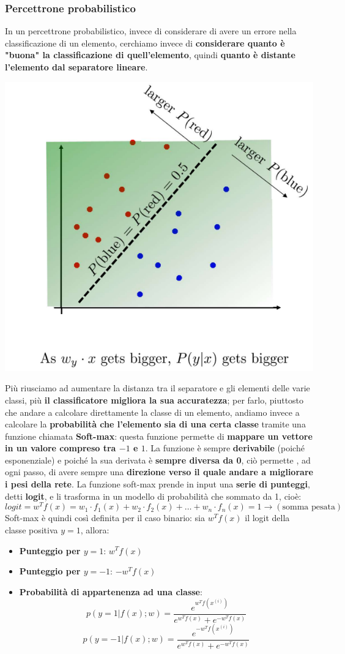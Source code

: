 \documentclass[12pt]{article}
\begin{document}
\subsubsection{Percettrone probabilistico}
In un percettrone probabilistico, invece di considerare di avere un errore nella classificazione di un elemento, cerchiamo invece di \textbf{considerare quanto è "buona" la classificazione di quell'elemento}, quindi \textbf{quanto è distante l'elemento dal separatore lineare}.
\begin{center}
    \includegraphics[width =0.50\linewidth]{Images/112.PNG}
\end{center}
Più riusciamo ad aumentare la distanza tra il separatore e gli elementi delle varie classi, più \textbf{il classificatore migliora la sua accuratezza};
per farlo, piuttosto che andare a calcolare direttamente la classe di un elemento, andiamo invece a calcolare la \textbf{probabilità che l'elemento sia di una certa classe} tramite una
funzione chiamata \textbf{Soft-max}: questa funzione permette di \textbf{mappare un vettore in un valore compreso tra $-1$ e $1$}. La funzione è sempre \textbf{derivabile} (poiché esponenziale) e poiché la sua derivata è \textbf{sempre diversa da 0}, ciò permette , ad ogni passo,
di avere sempre una \textbf{direzione verso il quale andare a migliorare i pesi della rete}. La funzione soft-max prende in input una \textbf{serie di punteggi}, detti \textbf{logit}, e li trasforma in un modello di probabilità che sommato da 1, cioè:
$$logit = w^T f(x) = w_1 \cdot f_1(x) + w_2 \cdot f_2(x) + \dots + w_n \cdot f_n(x) = 1 \rightarrow (\textrm{somma pesata})$$ 
Soft-max è quindi così definita per il caso binario: sia $w^T f(x)$ il logit della classe positiva $y = 1$, allora:
\begin{itemize}
    \item \textbf{Punteggio per $y = 1$}: $w^T f(x)$
    \item \textbf{Punteggio per $y = -1$}: $-w^T f(x)$
    \item \textbf{Probabilità di appartenenza ad una classe}: 
    $$p(y = 1|f(x); w) = \frac{e^{w^T f(x^{(i)})}}{e^{w^T f(x)} + e^{-w^T f(x)}}$$
    $$p(y = -1|f(x); w) = \frac{e^{-w^T f(x^{(i)})}}{e^{w^T f(x)} + e^{-w^T f(x)}}$$
\end{itemize}
\end{document}
